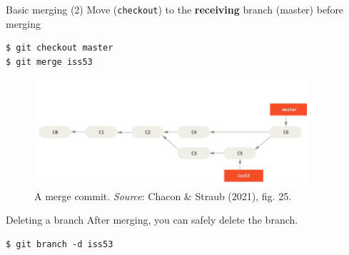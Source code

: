 \documentclass[handout]{beamer}
\begin{document}
\begin{frame}[fragile]{Basic merging (2)}
Move (\texttt{checkout}) to the \textbf{receiving} branch ({master}) before merging
\begin{lstlisting}
$ git checkout master
$ git merge iss53
\end{lstlisting}
\begin{figure}
	\includegraphics[width=0.9\textwidth]{figures/fig25_merge.png}
	\caption{A merge commit. \textit{Source}: Chacon \& Straub (2021), fig. 25.}
\end{figure}
\end{frame}

\begin{frame}[fragile]{Deleting a branch}
After merging, you can safely delete the branch. 
\begin{lstlisting}
$ git branch -d iss53
\end{lstlisting}
\end{frame}
\end{document}
